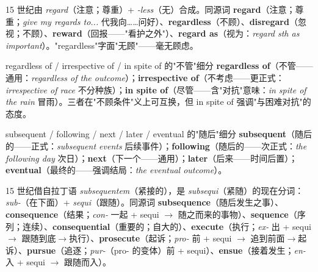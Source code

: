\documentclass[../main.tex]{subfiles}
\begin{document}
\begin{origin}
15 世纪由 \textit{regard}（注意；尊重）+ \textit{-less}（无）合成。同源词 \textbf{regard}（注意；尊重；\textit{give my regards to...} 代我向……问好）、\textbf{regardless}（不顾）、\textbf{disregard}（忽视；不顾）、\textbf{reward}（回报——"看护之外"）、\textbf{regard as}（视为：\textit{regard sth as important}）。"regardless"字面"无顾"——毫无顾虑。
\end{origin}



\begin{gram}{regardless of / irrespective of / in spite of 的"不管"细分}
\textbf{regardless of}（不管——通用：\textit{regardless of the outcome}）；\textbf{irrespective of}（不考虑——更正式：\textit{irrespective of race} 不分种族）；\textbf{in spite of}（尽管——含"对抗"意味：\textit{in spite of the rain} 冒雨）。三者在"不顾条件"义上可互换，但 in spite of 强调"与困难对抗"的态度。
\end{gram}



\begin{gram}{subsequent / following / next / later / eventual 的"随后"细分}
\textbf{subsequent}（随后的——正式：\textit{subsequent events} 后续事件）；\textbf{following}（随后的——次正式：\textit{the following day} 次日）；\textbf{next}（下一个——通用）；\textbf{later}（后来——时间后置）；\textbf{eventual}（最终的——强调结局：\textit{the eventual outcome}）。
\end{gram}

\begin{origin}
15 世纪借自拉丁语 \textit{subsequentem}（紧接的），是 \textit{subsequi}（紧随）的现在分词：\textit{sub-}（在下面）+ \textit{sequi}（跟随）。同源词 \textbf{subsequence}（随后发生之事）、\textbf{consequence}（结果；\textit{con-} 一起 + sequi $\to$ 随之而来的事物）、\textbf{sequence}（序列；连续）、\textbf{consequential}（重要的；自大的）、\textbf{execute}（执行；\textit{ex-} 出 + sequi $\to$ 跟随到底$\to$执行）、\textbf{prosecute}（起诉；\textit{pro-} 前 + sequi $\to$ 追到前面$\to$起诉）、\textbf{pursue}（追逐；\textit{pur-}（pro- 的变体）前 + sequi）、\textbf{ensue}（接着发生；\textit{en-} 入 + sequi $\to$ 跟随而入）。
\end{origin}
\end{document}
